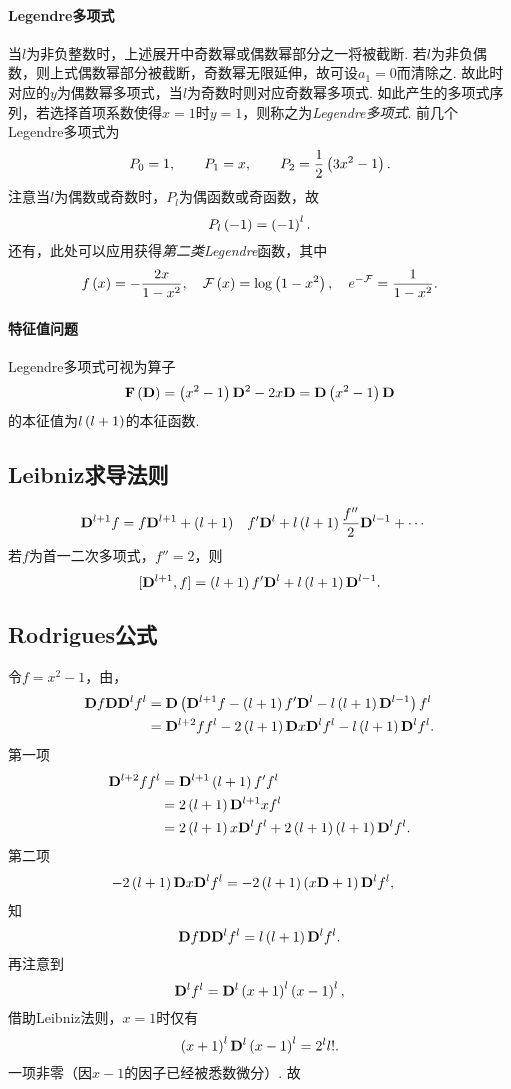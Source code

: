 \documentclass[UTF-8]{ctexart}
\begin{document}
  \paragraph{Legendre多项式}当$l$为非负整数时，上述展开中奇数幂或偶数幂部分之一将被截断. 若$l$为非负偶数，则上式偶数幂部分被截断，奇数幂无限延伸，故可设$a_1=0$而清除之. 故此时对应的$y$为偶数幂多项式，当$l$为奇数时则对应奇数幂多项式. 如此产生的多项式序列，若选择首项系数使得$x=1$时$y=1$，则称之为\emph{Legendre多项式}. 前几个Legendre多项式为
  \[ P_0 = 1, \qquad P_1 = x, \qquad P_2 = \frac{1}{2}\left(3x^2-1\right).\]
  注意当$l$为偶数或奇数时，$P_l$为偶函数或奇函数，故
  \[ P_l\left(-1\right) = \left(-1\right)^l. \]
  还有，此处可以应用获得\emph{第二类Legendre}函数，其中
  \[ f\left(x\right) = -\frac{2x}{1-x^2},\quad \mathcal{F}\left(x\right) = \log\left(1-x^2\right),\quad e^{-\mathcal{F}} = \frac{1}{1-x^2}. \]
  \paragraph{特征值问题}
  Legendre多项式可视为算子
  \[ \mathbf{F}\left(\mathbf{D}\right) = \left(x^2-1\right)\mathbf{D}^2-2x\mathbf{D} = \mathbf{D}\left(x^2-1\right)\mathbf{D} \]
  的本征值为$l\left(l+1\right)$的本征函数.
  \subsection{Leibniz求导法则}
  \begin{ex}
  \label{ex:DfD}
    \begin{alignat*}{2}
    \mathbf{D}^{l+1}f &= f \mathbf{D}^{l+1} + \left(l+1\right)&&f'\mathbf{D}^{l} + l\left(l+1\right)\frac{f''}{2}\mathbf{D}^{l-1} + \cdots
    \end{alignat*}
    若$f$为首一二次多项式，$f''=2$，则
    \[ [\mathbf{D}^{l+1}, f] = \left(l+1\right)f'\mathbf{D}^l + l\left(l+1\right)\mathbf{D}^{l-1}. \]
  \end{ex}
  \subsection{Rodrigues公式}
  令$f = x^2-1$，由，
  \begin{align*}
    \mathbf{D} f\mathbf{D} \mathbf{D} ^lf^l &= \mathbf{D} \left(\mathbf{D} ^{l+1}f - \left(l+1\right)f'\mathbf{D} ^l - l\left(l+1\right)\mathbf{D} ^{l-1}\right)f^l \\
    &= \mathbf{D} ^{l+2}ff^l - 2\left(l+1\right)\mathbf{D} x\mathbf{D} ^lf^l - l\left(l+1\right)\mathbf{D} ^lf^l.
  \end{align*}
  第一项
  \begin{align*}
    \mathbf{D} ^{l+2}ff^l &= \mathbf{D} ^{l+1}\left(l+1\right)f'f^l \\
    &= 2\left(l+1\right)\mathbf{D} ^{l+1}xf^l \\
    &= 2\left(l+1\right)x\mathbf{D} ^lf^l + 2\left(l+1\right)\left(l+1\right)\mathbf{D} ^lf^l.
  \end{align*}
  第二项
  \begin{align*}
    -2\left(l+1\right)\mathbf{D} x\mathbf{D} ^lf^l &= -2\left(l+1\right)\left(x\mathbf{D} +1\right)\mathbf{D} ^lf^l,
  \end{align*}
  知
  \[ \mathbf{D} f\mathbf{D} \mathbf{D} ^lf^l = l\left(l+1\right)\mathbf{D} ^lf^l. \]
  再注意到
  \[ \mathbf{D} ^lf^l = \mathbf{D} ^l\left(x+1\right)^l\left(x-1\right)^l, \]
  借助Leibniz法则，$x=1$时仅有
  \[ \left(x+1\right)^l\mathbf{D} ^l\left(x-1\right)^l = 2^l l!. \]
  一项非零（因$x-1$的因子已经被悉数微分）.
  故
\end{document}
